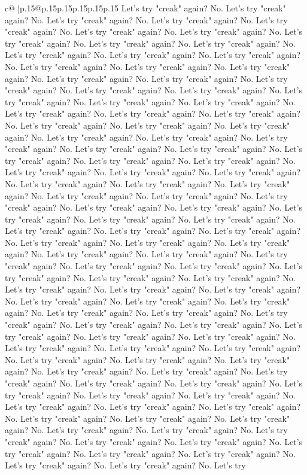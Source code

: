 \documentclass{article}
\begin{document}
{\begin{supertabular}{c@{$\;$}|p{.15\linewidth}@{}p{.15\linewidth}p{.15\linewidth}p{.15\linewidth}p{.15\linewidth}p{.15\linewidth}}
{{{Let's try "creak" again? No. Let's try "creak" again? No. Let's try "creak" again? No. Let's try "creak" again? No. Let's try "creak" again? No. Let's try "creak" again? No. Let's try "creak" again? No. Let's try "creak" again? No. Let's try "creak" again? No. Let's try "creak" again? No. Let's try "creak" again? No. Let's try "creak" again? No. Let's try "creak" again? No. Let's try "creak" again? No. Let's try "creak" again? No. Let's try "creak" again? No. Let's try "creak" again? No. Let's try "creak" again? No. Let's try "creak" again? No. Let's try "creak" again? No. Let's try "creak" again? No. Let's try "creak" again? No. Let's try "creak" again? No. Let's try "creak" again? No. Let's try "creak" again? No. Let's try "creak" again? No. Let's try "creak" again? No. Let's try "creak" again? No. Let's try "creak" again? No. Let's try "creak" again? No. Let's try "creak" again? No. Let's try "creak" again? No. Let's try "creak" again? No. Let's try "creak" again? No. Let's try "creak" again? No. Let's try "creak" again? No. Let's try "creak" again? No. Let's try "creak" again? No. Let's try "creak" again? No. Let's try "creak" again? No. Let's try "creak" again? No. Let's try "creak" again? No. Let's try "creak" again? No. Let's try "creak" again? No. Let's try "creak" again? No. Let's try "creak" again? No. Let's try "creak" again? No. Let's try "creak" again? No. Let's try "creak" again? No. Let's try "creak" again? No. Let's try "creak" again? No. Let's try "creak" again? No. Let's try "creak" again? No. Let's try "creak" again? No. Let's try "creak" again? No. Let's try "creak" again? No. Let's try "creak" again? No. Let's try "creak" again? No. Let's try "creak" again? No. Let's try "creak" again? No. Let's try "creak" again? No. Let's try "creak" again? No. Let's try "creak" again? No. Let's try "creak" again? No. Let's try "creak" again? No. Let's try "creak" again? No. Let's try "creak" again? No. Let's try "creak" again? No. Let's try "creak" again? No. Let's try "creak" again? No. Let's try "creak" again? No. Let's try "creak" again? No. Let's try "creak" again? No. Let's try "creak" again? No. Let's try "creak" again? No. Let's try "creak" again? No. Let's try "creak" again? No. Let's try "creak" again? No. Let's try "creak" again? No. Let's try "creak" again? No. Let's try "creak" again? No. Let's try "creak" again? No. Let's try "creak" again? No. Let's try "creak" again? No. Let's try "creak" again? No. Let's try "creak" again? No. Let's try "creak" again? No. Let's try "creak" again? No. Let's try "creak" again? No. Let's try "creak" again? No. Let's try "creak" again? No. Let's try "creak" again? No. Let's try "creak" again? No. Let's try "creak" again? No. Let's try "creak" again? No. Let's try "creak" again? No. Let's try "creak" again? No. Let's try "creak" again? No. Let's try "creak" again? No. Let's try "creak" again? No. Let's try "creak" again? No. Let's try "creak" again? No. Let's try "creak" again? No. Let's try "creak" again? No. Let's try "creak" again? No. Let's try "creak" again? No. Let's try "creak" again? No. Let's try "creak" again? No. Let's try "creak" again? No. Let's try "creak" again? No. Let's try }}}
\end{supertabular}}
\end{document}
